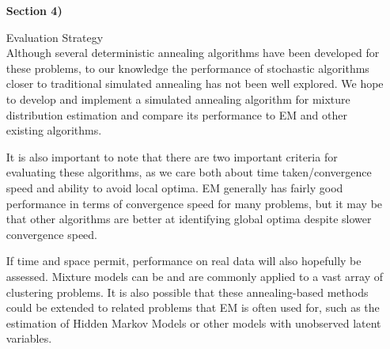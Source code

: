 \documentclass{article}
\theoremstyle{definition}
\begin{document}
\begin{itemize}
{  }



\vspace{1cm}



  \item[\textbf{Section 4)}] {Evaluation Strategy\\



  Although several deterministic annealing algorithms have been developed for these problems, to our knowledge the performance of stochastic algorithms closer to traditional simulated annealing has not been well explored. We hope to develop and implement a simulated annealing algorithm for mixture distribution estimation and compare its performance to EM and other existing algorithms.

  It is also important to note that there are two important criteria for evaluating these algorithms, as we care both about time taken/convergence speed and ability to avoid local optima. EM generally has fairly good performance in terms of convergence speed for many problems, but it may be that other algorithms are better at identifying global optima despite slower convergence speed.

  If time and space permit, performance on real data will also hopefully be assessed. Mixture models can be and are commonly applied to a vast array of clustering problems. It is also possible that these annealing-based methods could be extended to related problems that EM is often used for, such as the estimation of Hidden Markov Models or other models with unobserved latent variables.


  }

\end{itemize}






\end{document}
